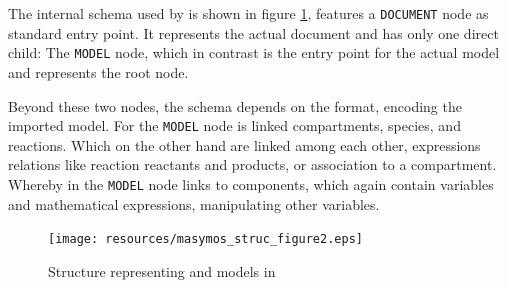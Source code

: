 The internal schema used by \masymos is shown in figure \ref{fig:background:graph-db:masymos}, features a \texttt{DOCUMENT} node as standard entry point. It represents the actual \xml document and has only one direct child: The \texttt{MODEL} node, which in contrast is the entry point for the actual model and represents the \xml root node.

Beyond these two nodes, the schema depends on the format, encoding the imported model. For \sbml the \texttt{MODEL} node is linked compartments, species, and reactions. Which on the other hand are linked among each other, expressions relations like reaction reactants and products, or association to a compartment.
Whereby in \cellml the \texttt{MODEL} node links to components, which again contain variables and mathematical expressions, manipulating other variables.

\begin{figure}
	\centering
	\texttt{[image: resources/masymos\_struc\_figure2.eps]}
	\caption{Structure representing \sbml and \cellml models in \masymos}
	\label{fig:background:graph-db:masymos}
\end{figure}

